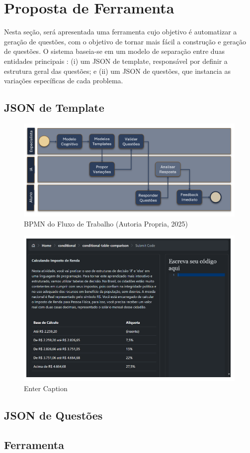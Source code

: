 \chapter{Proposta de Ferramenta}

Nesta seção, será apresentada uma ferramenta cujo objetivo é automatizar a geração de questões, com o objetivo de tornar mais fácil a construção e geração de questões. O sistema baseia-se em um modelo de separação entre duas entidades principais : (i) um JSON de template, responsável por definir a estrutura geral das questões; e (ii) um JSON de questões, que instancia as variações específicas de cada problema. 

\section{JSON de Template}
\begin{figure}[ht]
	\centering
	\includegraphics[width=14cm]{./imagens/capitulo6/bpmn-fluxo}
	\caption{BPMN do Fluxo de Trabalho (Autoria Propria, 2025) }
	\label{fig:bpmn-fluxo}
\end{figure}\begin{figure}
    \centering
    \includegraphics[width=0.5\linewidth]{imagens//capitulo7/repositorio-com-aig.png}
    \caption{Enter Caption}
    \label{fig:enter-label}
\end{figure}
\section{JSON de Questões}


\section{Ferramenta}